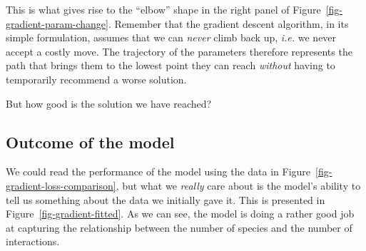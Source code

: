 \documentclass[
  letterpaper,
]{scrbook}
\begin{document}
This is what gives rise to the ``elbow'' shape in the right panel of
Figure~\ref{fig-gradient-param-change}. Remember that the gradient
descent algorithm, in its simple formulation, assumes that we can
\emph{never} climb back up, \emph{i.e.} we never accept a costly move.
The trajectory of the parameters therefore represents the path that
brings them to the lowest point they can reach \emph{without} having to
temporarily recommend a worse solution.

But how good is the solution we have reached?

\subsection{Outcome of the model}\label{outcome-of-the-model}

We could read the performance of the model using the data in
Figure~\ref{fig-gradient-loss-comparison}, but what we \emph{really}
care about is the model's ability to tell us something about the data we
initially gave it. This is presented in
Figure~\ref{fig-gradient-fitted}. As we can see, the model is doing a
rather good job at capturing the relationship between the number of
species and the number of interactions.

\begin{figure}[bt]



\end{figure}%
\end{document}
